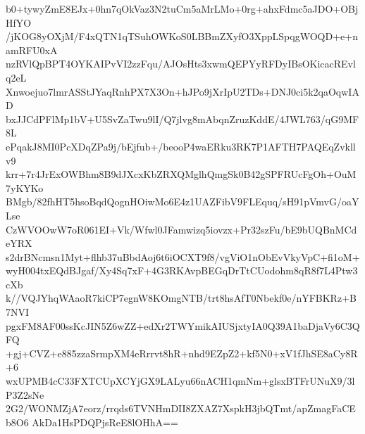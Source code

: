 b0+tywyZmE8EJx+0hn7qOkVaz3N2tuCm5aMrLMo+0rg+ahxFdmc5aJDO+OBjHfYO
/jKOG8yOXjM/F4xQTN1qTSuhOWKoS0LBBmZXyfO3XppLSpqgWOQD+e+namRFU0xA
nzRVlQpBPT4OYKAIPvVI2zzFqu/AJOsHts3xwmQEPYyRFDyIBsOKicacREvlq2eL
Xnwoejuo7lmrASStJYaqRnhPX7X3On+hJPo9jXrIpU2TDs+DNJ0ci5k2qaOqwIAD
bxJJCdPFlMp1bV+U5SvZaTwu9lI/Q7jlvg8mAbqnZruzKddE/4JWL763/qG9MF8L
ePqakJ8MI0PcXDqZPa9j/bEjfub+/beooP4waERku3RK7P1AFTH7PAQEqZvkllv9
krr+7r4JrExOWBhm8B9dJXcxKbZRXQMglhQmgSk0B42gSPFRUcFgOh+OuM7yKYKo
BMgb/82fhHT5hsoBqdQognHOiwMo6E4z1UAZFibV9FLEquq/sH91pVmvG/oaYLse
CzWVOOwW7oR061EI+Vk/Wfwl0JFamwizq5iovzx+Pr32szFu/bE9bUQBnMCdeYRX
s2drBNcmsn1Myt+flhb37uBbdAoj6t6iOCXT9f8/vgViO1nObEvVkyVpC+fi1oM+
wyH004txEQdBJgaf/Xy4Sq7xF+4G3RKAvpBEGqDrTtCUodohm8qR8f7L4Ptw3cXb
k//VQJYhqWAaoR7kiCP7egnW8KOmgNTB/trt8hsAfT0Nbekf0e/nYFBKRz+B7NVI
pgxFM8AF00ssKcJIN5Z6wZZ+edXr2TWYmikAIUSjxtyIA0Q39A1baDjaVy6C3QFQ
+gj+CVZ+e885zzaSrmpXM4eRrrvt8hR+nhd9EZpZ2+kf5N0+xV1fJhSE8aCy8R+6
wxUPMB4cC33FXTCUpXCYjGX9LALyu66nACH1qmNm+glsxBTFrUNuX9/3lP3Z2sNe
2G2/WONMZjA7eorz/rrqds6TVNHmDII8ZXAZ7XspkH3jbQTmt/apZmagFaCEb8O6
AkDa1HsPDQPjsReE8lOHhA==
